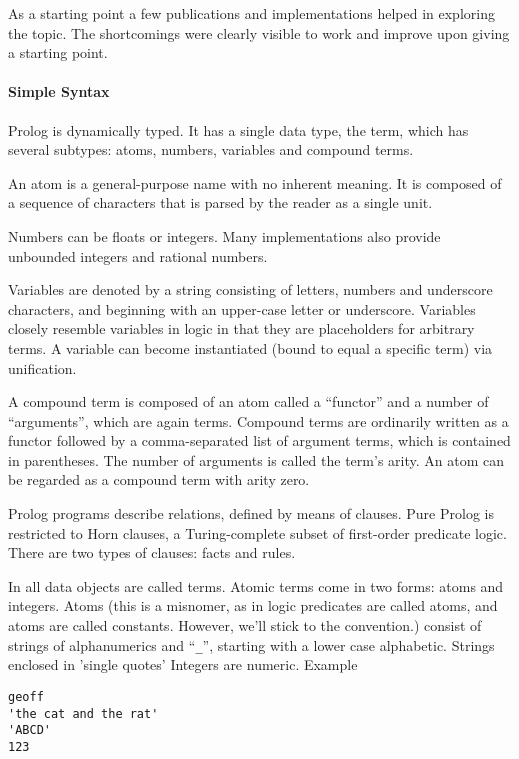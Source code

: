 \documentclass[thesis-solanki.tex]{subfiles}
\begin{document}
As a starting point a few publications and implementations helped in exploring the topic. The shortcomings were clearly visible to work and
improve upon giving a starting point.


\paragraph{Simple Syntax}
\cite{wikiprolog}

Prolog is dynamically typed. It has a single data type, the term, which has several subtypes: atoms, numbers, variables and compound terms.

An atom is a general-purpose name with no inherent meaning. It is composed of a sequence of characters that is parsed by the 
reader 
as a single unit.

Numbers can be floats or integers. Many 
 implementations also provide unbounded integers and rational numbers.

Variables are denoted by a string consisting of letters, numbers and underscore characters, and beginning with an upper-case letter or 
underscore. Variables closely resemble variables in logic in that they are placeholders for arbitrary terms. A variable can become 
instantiated (bound to equal a specific term) via unification.

A compound term is composed of an atom called a ``functor'' and a number of ``arguments'', which are again terms. Compound terms are 
ordinarily 
written as a functor followed by a comma-separated list of argument terms, which is contained in parentheses. The number of arguments is 
called the term's arity. An atom can be regarded as a compound term with arity zero.

Prolog programs describe relations, defined by means of clauses. Pure Prolog is restricted to Horn clauses, a Turing-complete subset of 
first-order predicate logic. There are two types of clauses: facts and rules.

\cite{website:prologintroumiami}
In 
 all data objects are called terms.
 Atomic terms
 come in two forms: atoms and integers.
 Atoms (this is a misnomer,
 as in logic predicates are called atoms, and atoms are called constants. However, we'll stick to the 
 convention.)
consist of
strings of alphanumerics and ``\texttt{\_}'', starting with a lower case alphabetic.
Strings enclosed in 'single quotes'
Integers are numeric.
Example
\par
\begin{verbatim}
geoff
'the cat and the rat'
'ABCD'
123
\end{verbatim}
     
\end{document}
